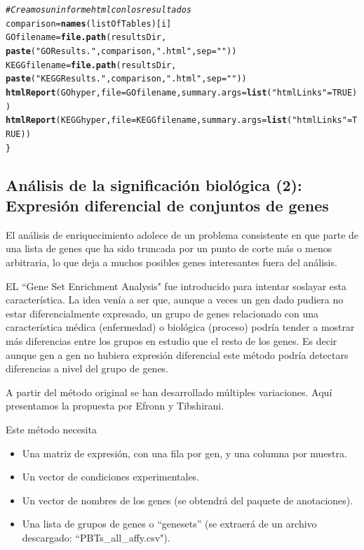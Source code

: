 \documentclass[a4paper]{article}\usepackage[]{graphicx}\usepackage[]{color}
\makeatletter
\newcommand{\hlnum}[1]{\textcolor[rgb]{0.686,0.059,0.569}{#1}}%
\newcommand{\hlstr}[1]{\textcolor[rgb]{0.192,0.494,0.8}{#1}}%
\newcommand{\hlcom}[1]{\textcolor[rgb]{0.678,0.584,0.686}{\textit{#1}}}%
\newcommand{\hlstd}[1]{\textcolor[rgb]{0.345,0.345,0.345}{#1}}%
\newcommand{\hlkwb}[1]{\textcolor[rgb]{0.69,0.353,0.396}{#1}}%
\newcommand{\hlkwc}[1]{\textcolor[rgb]{0.333,0.667,0.333}{#1}}%
\newcommand{\hlkwd}[1]{\textcolor[rgb]{0.737,0.353,0.396}{\textbf{#1}}}%
\newenvironment{kframe}{%
 \def\at@end@of@kframe{}%
 \ifinner\ifhmode%
  \def\at@end@of@kframe{\end{minipage}}%
  \begin{minipage}{\columnwidth}%
 \fi\fi%
 \def\FrameCommand##1{\hskip\@totalleftmargin \hskip-\fboxsep
 \colorbox{shadecolor}{##1}\hskip-\fboxsep
     \hskip-\linewidth \hskip-\@totalleftmargin \hskip\columnwidth}%
 \MakeFramed {\advance\hsize-\width
   \@totalleftmargin\z@ \linewidth\hsize
   \@setminipage}}%
 {\par\unskip\endMakeFramed%
 \at@end@of@kframe}
\newenvironment{knitrout}{}{} %
\makeatother
\begin{document}
\begin{knitrout}
\begin{kframe}
\begin{alltt}
\hlcom{# Creamos un informe html con los resultados}
   \hlstd{comparison} \hlkwb{=} \hlkwd{names}\hlstd{(listOfTables)[i]}
   \hlstd{GOfilename} \hlkwb{=}\hlkwd{file.path}\hlstd{(resultsDir,}
     \hlkwd{paste}\hlstd{(}\hlstr{"GOResults."}\hlstd{,comparison,}\hlstr{".html"}\hlstd{,} \hlkwc{sep}\hlstd{=}\hlstr{""}\hlstd{))}
   \hlstd{KEGGfilename} \hlkwb{=}\hlkwd{file.path}\hlstd{(resultsDir,}
     \hlkwd{paste}\hlstd{(}\hlstr{"KEGGResults."}\hlstd{,comparison,}\hlstr{".html"}\hlstd{,} \hlkwc{sep}\hlstd{=}\hlstr{""}\hlstd{))}
  \hlkwd{htmlReport}\hlstd{(GOhyper,} \hlkwc{file} \hlstd{= GOfilename,} \hlkwc{summary.args}\hlstd{=}\hlkwd{list}\hlstd{(}\hlstr{"htmlLinks"}\hlstd{=}\hlnum{TRUE}\hlstd{))}
  \hlkwd{htmlReport}\hlstd{(KEGGhyper,} \hlkwc{file} \hlstd{= KEGGfilename,} \hlkwc{summary.args}\hlstd{=}\hlkwd{list}\hlstd{(}\hlstr{"htmlLinks"}\hlstd{=}\hlnum{TRUE}\hlstd{))}
\hlstd{\}}
\end{alltt}
\end{kframe}
\end{knitrout}

\subsection{Análisis de la significación biológica (2): Expresión diferencial de conjuntos de genes}

El análisis de enriquecimiento adolece de un problema consistente en que parte de una lista de genes que ha sido truncada por un punto de corte más o menos arbitraria, lo que deja a muchos posibles genes interesantes fuera del análisis.

EL ``Gene Set Enrichment Analysis" fue introducido para intentar soslayar esta característica. La idea venía a ser que, aunque a veces un gen dado pudiera no estar diferencialmente expresado, un grupo de genes relacionado con una característica médica (enfermedad) o biológica (proceso) podría tender a mostrar más diferencias entre los grupos en estudio que el resto de los genes. Es decir aunque gen a gen no hubiera expresión diferencial este método podría detectars diferencias a nivel del grupo de genes.

A partir del método original se han desarrollado múltiples variaciones. 
Aquí presentamos la propuesta por Efronn y Tibshirani.

Este método necesita
\begin{itemize}
  \item Una matriz de expresión, con una fila por gen, y una columna por muestra.
  \item Un vector de condiciones experimentales.
  \item Un vector de nombres de los genes (se obtendrá del paquete de anotaciones).
  \item Una lista de grupos de genes o ``genesets'' (se extraerá de un archivo descargado: ``PBTs_all_affy.csv").
\end{itemize}
\end{document}
